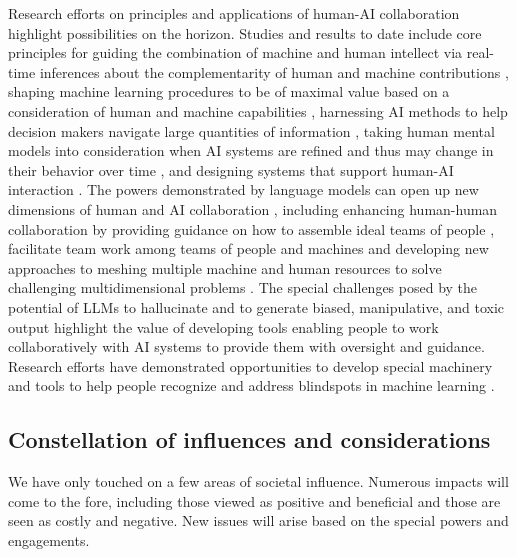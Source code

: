 Research efforts on principles and applications of human-AI collaboration highlight possibilities on the horizon. Studies and results to date include core principles for guiding the combination of machine and human intellect via real-time inferences about the complementarity of human and machine contributions \cite{mixedinit1999, complementary2007, kamar2012, ramakrishnan2019}, shaping machine learning procedures to be of maximal value based on a consideration of human and machine capabilities \cite{wilder2020, bansal2021}, harnessing AI methods to help decision makers navigate large quantities of information \cite{aidisplay1995}, taking human mental models into consideration when AI systems are refined and thus may change in their behavior over time \cite{bansal2019}, and designing systems that support human-AI interaction \cite{amershi2019}. The powers demonstrated by language models can open up new dimensions of human and AI collaboration \cite{mixedinitfutures2007}, including enhancing human-human collaboration by providing guidance on how to assemble ideal teams of people \cite{singla2015}, facilitate team work among teams of people and machines \cite{bohus2009} and developing new approaches to meshing multiple machine and human resources to solve challenging multidimensional problems \cite{Shahaf2010}. The special challenges posed by the potential of LLMs to hallucinate and to generate biased, manipulative, and toxic output highlight the value of developing tools enabling people to work collaboratively with AI systems to provide them with oversight and guidance. Research efforts have demonstrated opportunities to develop special machinery and tools to help people recognize and address blindspots in machine learning \cite{Lakkaraju2017}. 

\subsection{Constellation of influences and considerations} 

We have only touched on a few areas of societal influence. Numerous impacts will come to the fore, including those viewed as positive and beneficial and those are seen as costly and negative. New issues will arise based on the special powers and engagements. 

